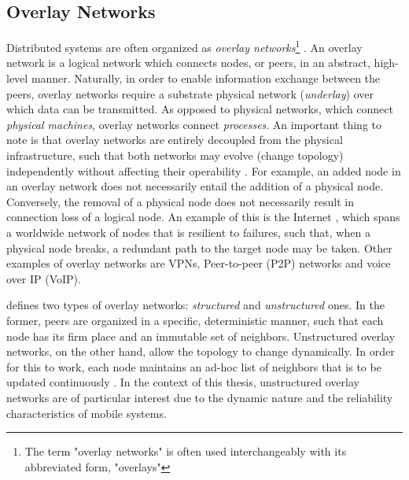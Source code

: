 \subsection{Overlay Networks}
Distributed systems are often organized as \emph{overlay networks}\footnote{The term "overlay networks" is often used interchangeably with its abbreviated form, "overlays"} \cite{tarkoma2010overlay}. An overlay network is a logical network which connects nodes, or peers, in an abstract, high-level manner. Naturally, in order to enable information exchange between the peers, overlay networks require a substrate physical network (\emph{underlay}) over which data can be transmitted. As opposed to physical networks, which connect \emph{physical machines}, overlay networks connect \emph{processes}. An important thing to note is that overlay networks are entirely decoupled from the physical infrastructure, such that both networks may evolve (change topology) independently without affecting their operability \cite{tanenbaum2017distributed}. For example, an added node in an overlay network does not necessarily entail the addition of a physical node. Conversely, the removal of a physical node does not necessarily result in connection loss of a logical node. An example of this is the Internet \cite{vaezi2017virtualization}, which spans a worldwide network of nodes that is resilient to failures, such that, when a physical node breaks, a redundant path to the target node may be taken. Other examples of overlay networks are VPNs, Peer-to-peer (P2P) networks and voice over IP (VoIP).

\citeauthor*{tarkoma2010overlay} defines two types of overlay networks: \emph{structured} and \emph{unstructured} ones. In the former, peers are organized in a specific, deterministic manner, such that each node has its firm place and an immutable set of neighbors. Unstructured overlay networks, on the other hand, allow the topology to change dynamically. In order for this to work, each node maintains an ad-hoc list of neighbors that is to be updated continuously \cite{tanenbaum2017distributed}. In the context of this thesis, unstructured overlay networks are of particular interest due to the dynamic nature and the reliability characteristics of mobile systems. 

